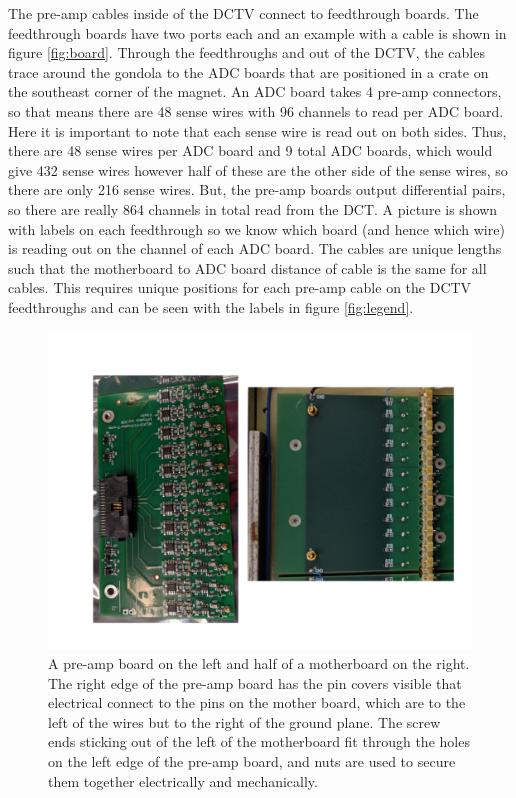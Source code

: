 \documentclass[12pt]{article}
\begin{document}
The pre-amp cables inside of the DCTV connect to feedthrough boards. The feedthrough boards have two ports each and an example with a cable is shown in figure \ref{fig:board}. Through the feedthroughs and out of the DCTV, the cables trace around the gondola to the ADC boards that are positioned in a crate on the southeast corner of the magnet.
An ADC board takes 4 pre-amp connectors, so that means there are 48 sense wires with 96 channels to read per ADC board. Here it is important to note that each sense wire is read out on both sides. Thus, there are 48 sense wires per ADC board and 9 total ADC boards, which would give 432 sense wires however half of these are the other side of the sense wires, so there are only 216 sense wires. But, the pre-amp boards output differential pairs, so there are really 864 channels in total read from the DCT. A picture is shown with labels on each feedthrough so we know which board (and hence which wire) is reading out on the channel of each ADC board. The cables are unique lengths such that the motherboard to ADC board distance of cable is the same for all cables. This requires unique positions for each pre-amp cable on the DCTV feedthroughs and can be seen with the labels in figure \ref{fig:legend}. 

\begin{figure}
  \centering
  \includegraphics[scale=0.25]{DCT_Preampboard.png}
  \caption{A pre-amp board on the left and half of a motherboard on the right. The right edge of the pre-amp board has the pin covers visible that electrical connect to the pins on the mother board, which are to the left of the wires but to the right of the ground plane. The screw ends sticking out of the left of the motherboard fit through the holes on the left edge of the pre-amp board, and nuts are used to secure them together electrically and mechanically.}
  \label{fig:Pre-amp}
\end{figure}
\end{document}
